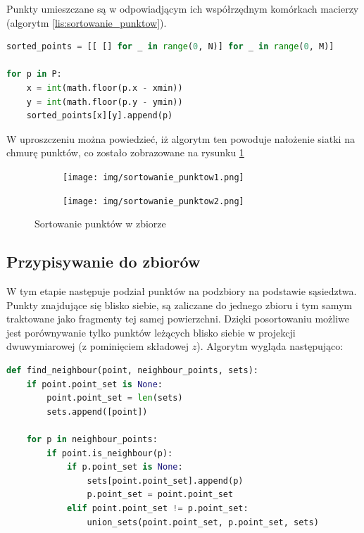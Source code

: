 \noindent Punkty umieszczane są w odpowiadjącym ich współrzędnym komórkach macierzy (algorytm \ref{lis:sortowanie_punktow}).

\begin{lstlisting}[frame=L, language=python, caption={Sortowanie punktów}, label={lis:sortowanie_punktow}]
sorted_points = [[ [] for _ in range(0, N)] for _ in range(0, M)]

for p in P:
    x = int(math.floor(p.x - xmin))
    y = int(math.floor(p.y - ymin))
    sorted_points[x][y].append(p)

\end{lstlisting}

W uproszczeniu można powiedzieć, iż algorytm ten powoduje nałożenie siatki na chmurę punktów, co zostało zobrazowane na rysunku \ref{fig:sortowanie_punktow}

\begin{figure}[h!]
	\centering
    \begin{subfigure}[b]{0.3\textwidth}
        \texttt{[image: img/sortowanie\_punktow1.png]}
    \end{subfigure}%
	\quad
    \begin{subfigure}[b]{0.3\textwidth}
        \texttt{[image: img/sortowanie\_punktow2.png]}
    \end{subfigure}%
    \caption{Sortowanie punktów w zbiorze}
    \label{fig:sortowanie_punktow}
\end{figure}

\subsection{Przypisywanie do zbiorów}
W tym etapie następuje podział punktów na podzbiory na podstawie sąsiedztwa. Punkty znajdujące się blisko siebie,
są zaliczane do jednego zbioru i tym samym traktowane jako fragmenty tej samej powierzchni. Dzięki posortowaniu
możliwe jest porównywanie tylko punktów leżących blisko siebie w projekcji dwuwymiarowej (z pominięciem składowej $z$).
Algorytm wygląda następująco:

\begin{lstlisting}[frame=L, language=python, caption={Podział punktów na zbiory w algorytmie naiwnym}, label={lis:podzial_naiwny}]
def find_neighbour(point, neighbour_points, sets):
    if point.point_set is None:
        point.point_set = len(sets)
        sets.append([point])

    for p in neighbour_points:
        if point.is_neighbour(p):
            if p.point_set is None:
                sets[point.point_set].append(p)
                p.point_set = point.point_set
            elif point.point_set != p.point_set:
                union_sets(point.point_set, p.point_set, sets)
\end{lstlisting}

